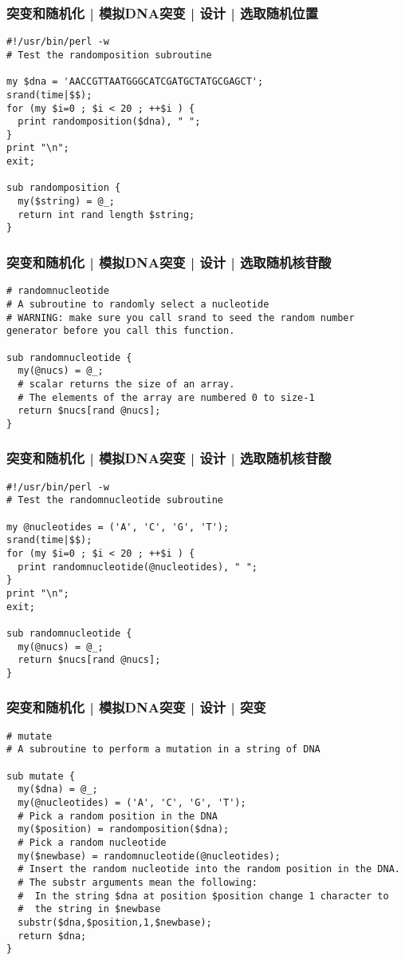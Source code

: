 \begin{frame}[fragile]
  \frametitle{突变和随机化 | 模拟DNA突变 | 设计 | \alert{选取随机位置}}
\begin{lstlisting}
#!/usr/bin/perl -w
# Test the randomposition subroutine

my $dna = 'AACCGTTAATGGGCATCGATGCTATGCGAGCT';
srand(time|$$);
for (my $i=0 ; $i < 20 ; ++$i ) {
  print randomposition($dna), " ";
}
print "\n";
exit;
  
sub randomposition {
  my($string) = @_;
  return int rand length $string;
}
\end{lstlisting}
\end{frame}

\begin{frame}[fragile]
  \frametitle{突变和随机化 | 模拟DNA突变 | 设计 | 选取随机核苷酸}
\begin{lstlisting}
# randomnucleotide
# A subroutine to randomly select a nucleotide
# WARNING: make sure you call srand to seed the random number generator before you call this function.

sub randomnucleotide {
  my(@nucs) = @_;
  # scalar returns the size of an array. 
  # The elements of the array are numbered 0 to size-1
  return $nucs[rand @nucs];
}
\end{lstlisting}
\end{frame}

\begin{frame}[fragile]
  \frametitle{突变和随机化 | 模拟DNA突变 | 设计 | \alert{选取随机核苷酸}}
\begin{lstlisting}
#!/usr/bin/perl -w
# Test the randomnucleotide subroutine

my @nucleotides = ('A', 'C', 'G', 'T');
srand(time|$$);
for (my $i=0 ; $i < 20 ; ++$i ) {
  print randomnucleotide(@nucleotides), " ";
}
print "\n";
exit;

sub randomnucleotide {
  my(@nucs) = @_;
  return $nucs[rand @nucs];
}
\end{lstlisting}
\end{frame}

\begin{frame}[fragile]
  \frametitle{突变和随机化 | 模拟DNA突变 | 设计 | \alert{突变}}
\begin{lstlisting}[basicstyle=\footnotesize\tt,numberstyle=\scriptsize]
# mutate
# A subroutine to perform a mutation in a string of DNA

sub mutate {
  my($dna) = @_;
  my(@nucleotides) = ('A', 'C', 'G', 'T');
  # Pick a random position in the DNA
  my($position) = randomposition($dna);
  # Pick a random nucleotide
  my($newbase) = randomnucleotide(@nucleotides);
  # Insert the random nucleotide into the random position in the DNA.
  # The substr arguments mean the following:
  #  In the string $dna at position $position change 1 character to
  #  the string in $newbase
  substr($dna,$position,1,$newbase);
  return $dna;
}
\end{lstlisting}
\end{frame}

